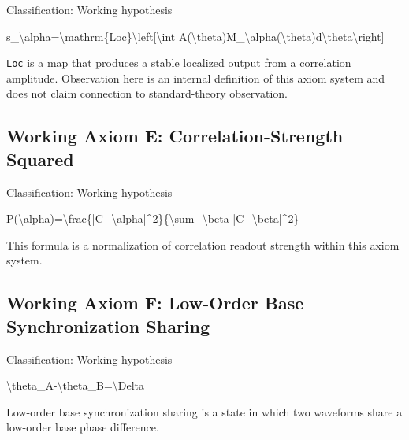 \documentclass[
  a4paper,
]{article}
\newenvironment{Shaded}{}{}
\newcommand{\NormalTok}[1]{#1}
\begin{document}
Classification: Working hypothesis

\begin{Shaded}
\begin{Highlighting}[]
\NormalTok{s\_\textbackslash{}alpha=\textbackslash{}mathrm\{Loc\}\textbackslash{}left[\textbackslash{}int A(\textbackslash{}theta)M\_\textbackslash{}alpha(\textbackslash{}theta)d\textbackslash{}theta\textbackslash{}right]}
\end{Highlighting}
\end{Shaded}

\texttt{Loc} is a map that produces a stable localized output from a
correlation amplitude. Observation here is an internal definition of
this axiom system and does not claim connection to standard-theory
observation.

\subsection{Working Axiom E: Correlation-Strength
Squared}\label{working-axiom-e-correlation-strength-squared}

Classification: Working hypothesis

\begin{Shaded}
\begin{Highlighting}[]
\NormalTok{P(\textbackslash{}alpha)=\textbackslash{}frac\{|C\_\textbackslash{}alpha|\^{}2\}\{\textbackslash{}sum\_\textbackslash{}beta |C\_\textbackslash{}beta|\^{}2\}}
\end{Highlighting}
\end{Shaded}

This formula is a normalization of correlation readout strength within
this axiom system.

\subsection{Working Axiom F: Low-Order Base Synchronization
Sharing}\label{working-axiom-f-low-order-base-synchronization-sharing}

Classification: Working hypothesis

\begin{Shaded}
\begin{Highlighting}[]
\NormalTok{\textbackslash{}theta\_A{-}\textbackslash{}theta\_B=\textbackslash{}Delta}
\end{Highlighting}
\end{Shaded}

Low-order base synchronization sharing is a state in which two waveforms
share a low-order base phase difference.
\end{document}
